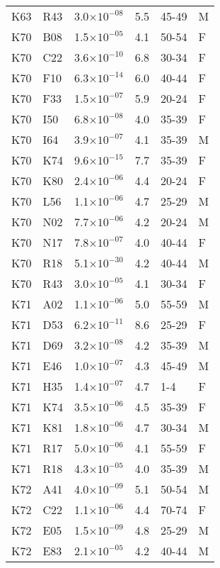 \begin{longtable}{lllrll}
   K63 & R43 & 3.0$\times10^{-08}$ & 5.5 & 45-49 & M \\ 
   K70 & B08 & 1.5$\times10^{-05}$ & 4.1 & 50-54 & F \\ 
   K70 & C22 & 3.6$\times10^{-10}$ & 6.8 & 30-34 & F \\ 
   K70 & F10 & 6.3$\times10^{-14}$ & 6.0 & 40-44 & F \\ 
   K70 & F33 & 1.5$\times10^{-07}$ & 5.9 & 20-24 & F \\ 
   K70 & I50 & 6.8$\times10^{-08}$ & 4.0 & 35-39 & F \\ 
   K70 & I64 & 3.9$\times10^{-07}$ & 4.1 & 35-39 & M \\ 
   K70 & K74 & 9.6$\times10^{-15}$ & 7.7 & 35-39 & F \\ 
   K70 & K80 & 2.4$\times10^{-06}$ & 4.4 & 20-24 & F \\ 
   K70 & L56 & 1.1$\times10^{-06}$ & 4.7 & 25-29 & M \\ 
   K70 & N02 & 7.7$\times10^{-06}$ & 4.2 & 20-24 & M \\ 
   K70 & N17 & 7.8$\times10^{-07}$ & 4.0 & 40-44 & F \\ 
   K70 & R18 & 5.1$\times10^{-30}$ & 4.2 & 40-44 & M \\ 
   K70 & R43 & 3.0$\times10^{-05}$ & 4.1 & 30-34 & F \\ 
   K71 & A02 & 1.1$\times10^{-06}$ & 5.0 & 55-59 & M \\ 
   K71 & D53 & 6.2$\times10^{-11}$ & 8.6 & 25-29 & F \\ 
   K71 & D69 & 3.2$\times10^{-08}$ & 4.2 & 35-39 & M \\ 
   K71 & E46 & 1.0$\times10^{-07}$ & 4.3 & 45-49 & M \\ 
   K71 & H35 & 1.4$\times10^{-07}$ & 4.7 & 1-4 & F \\ 
   K71 & K74 & 3.5$\times10^{-06}$ & 4.5 & 35-39 & F \\ 
   K71 & K81 & 1.8$\times10^{-06}$ & 4.7 & 30-34 & M \\ 
   K71 & R17 & 5.0$\times10^{-06}$ & 4.1 & 55-59 & F \\ 
   K71 & R18 & 4.3$\times10^{-05}$ & 4.0 & 35-39 & M \\ 
   K72 & A41 & 4.0$\times10^{-09}$ & 5.1 & 50-54 & M \\ 
   K72 & C22 & 1.1$\times10^{-06}$ & 4.4 & 70-74 & F \\ 
   K72 & E05 & 1.5$\times10^{-09}$ & 4.8 & 25-29 & M \\ 
   K72 & E83 & 2.1$\times10^{-05}$ & 4.2 & 40-44 & M \\ 

\end{longtable}
